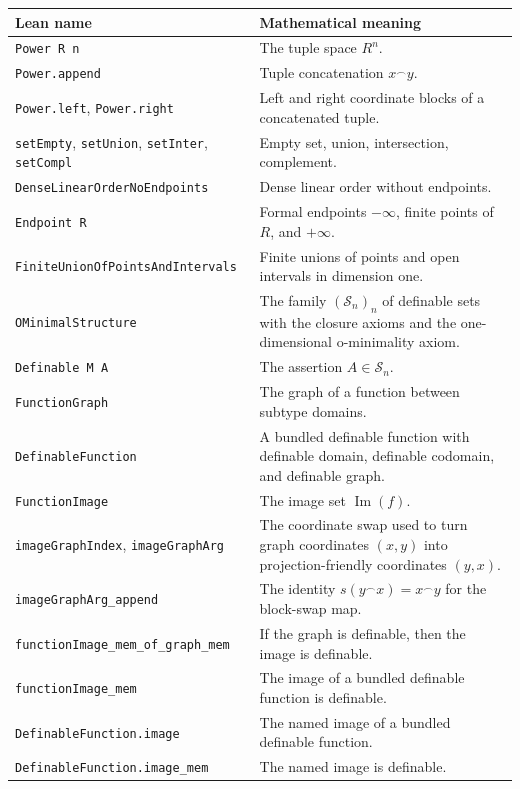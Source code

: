 \documentclass[11pt]{article}
\newcommand{\Sfam}{\mathcal S}
\newcommand{\Imf}{\operatorname{Im}}
\newcommand{\cat}{\mathbin{{}^\frown}}
\newcommand{\Lean}[1]{\texttt{#1}}
\begin{document}
\begin{longtable}{>{\raggedright\arraybackslash}p{}>{\raggedright\arraybackslash}p{}}
\toprule
Lean name & Mathematical meaning \\
\midrule
\endhead
\Lean{Power R n} & The tuple space $R^n$. \\
\Lean{Power.append} & Tuple concatenation $x\cat y$. \\
\Lean{Power.left}, \Lean{Power.right} & Left and right coordinate blocks of a concatenated tuple. \\
\Lean{setEmpty}, \Lean{setUnion}, \Lean{setInter}, \Lean{setCompl} & Empty set, union, intersection, complement. \\
\Lean{DenseLinearOrderNoEndpoints} & Dense linear order without endpoints. \\
\Lean{Endpoint R} & Formal endpoints $-\infty$, finite points of $R$, and $+\infty$. \\
\Lean{FiniteUnionOfPointsAndIntervals} & Finite unions of points and open intervals in dimension one. \\
\Lean{OMinimalStructure} & The family $(\Sfam_n)_n$ of definable sets with the closure axioms and the one-dimensional o-minimality axiom. \\
\Lean{Definable M A} & The assertion $A\in\Sfam_n$. \\
\Lean{FunctionGraph} & The graph of a function between subtype domains. \\
\Lean{DefinableFunction} & A bundled definable function with definable domain, definable codomain, and definable graph. \\
\Lean{FunctionImage} & The image set $\Imf(f)$. \\
\Lean{imageGraphIndex}, \Lean{imageGraphArg} & The coordinate swap used to turn graph coordinates $(x,y)$ into projection-friendly coordinates $(y,x)$. \\
\Lean{imageGraphArg\_append} & The identity $s(y\cat x)=x\cat y$ for the block-swap map. \\
\Lean{functionImage\_mem\_of\_graph\_mem} & If the graph is definable, then the image is definable. \\
\Lean{functionImage\_mem} & The image of a bundled definable function is definable. \\
\Lean{DefinableFunction.image} & The named image of a bundled definable function. \\
\Lean{DefinableFunction.image\_mem} & The named image is definable. \\

\end{longtable}
\end{document}
